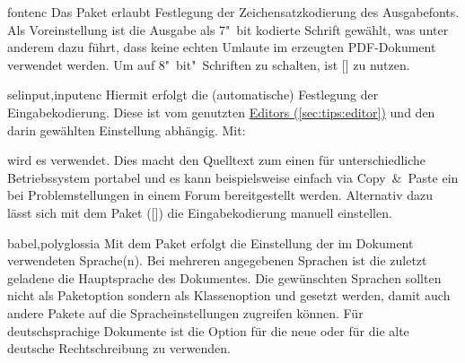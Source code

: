 \begin{packages}
\item[fontenc]
  Das Paket erlaubt Festlegung der Zeichensatzkodierung des Ausgabefonts. Als 
  Voreinstellung ist die Ausgabe als 7"~bit kodierte Schrift gewählt, was unter 
  anderem dazu führt, dass keine echten Umlaute im erzeugten PDF-Dokument 
  verwendet werden. Um auf 8"~bit"~Schriften zu schalten, ist
  [] zu nutzen.
\item[selinput,inputenc]
  Hiermit erfolgt die (automatische) Festlegung der Eingabekodierung. Diese ist 
  vom genutzten \hyperref[sec:tips:editor]{Editors (\autoref{sec:tips:editor})} 
  und den darin gewählten Einstellung abhängig. Mit:
  \begin{Code}
    \usepackage{selinput}
  \end{Code}\vspace{-\baselineskip}%
  wird es verwendet. Dies macht den Quelltext zum einen für unterschiedliche 
  Betriebssystem portabel und es kann beispielsweise einfach via Copy~\&~Paste 
  ein  bei 
  Problemstellungen in einem Forum bereitgestellt werden. Alternativ dazu lässt 
  sich mit dem Paket  
  ([])
  die Eingabekodierung manuell einstellen.
\item[babel,polyglossia]
  Mit dem Paket  erfolgt die Einstellung der im Dokument 
  verwendeten Sprache(n). Bei mehreren angegebenen Sprachen ist die zuletzt 
  geladene die Hauptsprache des Dokumentes. Die gewünschten Sprachen sollten 
  nicht als Paketoption sondern als Klassenoption und gesetzt werden, damit 
  auch andere Pakete auf die Spracheinstellungen zugreifen können. Für 
  deutschsprachige Dokumente ist die Option  für die neue oder 
   für die alte deutsche Rechtschreibung zu verwenden. 
  

\end{packages}
